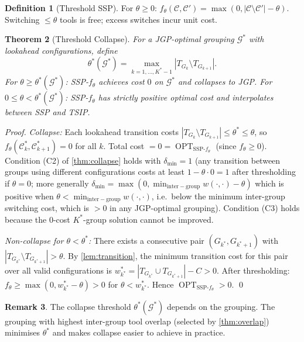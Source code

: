 \documentclass[11pt,a4paper]{article}
\theoremstyle{plain}
\newtheorem{theorem}{Theorem}[section]
\theoremstyle{definition}
\newtheorem{definition}[theorem]{Definition}
\newtheorem{remark}[theorem]{Remark}
\DeclareMathOperator{\OPT}{OPT}
\newcommand{\calG}{\mathcal{G}}
\newcommand{\Kstar}{K^{*}}
\newcommand{\sw}[2]{w(#1,#2)}
\begin{document}
\begin{definition}[Threshold SSP]
For $\theta\ge 0$:
$f_\theta(\mathcal{C},\mathcal{C}')=\max(0,|\mathcal{C}\setminus\mathcal{C}'|-\theta)$.
Switching $\le\theta$ tools is free; excess switches incur unit cost.
\end{definition}

\begin{thmbox}
\begin{theorem}[Threshold Collapse]
\label{thm:threshold}
For a JGP-optimal grouping $\calG^*$ with lookahead configurations, define
\[
  \theta^*(\calG^*)=\max_{k=1,\ldots,\Kstar-1}|T_{G_k}\setminus T_{G_{k+1}}|.
\]
For $\theta\ge\theta^*(\calG^*)$: SSP-$f_\theta$ achieves cost $0$ on $\calG^*$
and collapses to JGP. For $0\le\theta<\theta^*(\calG^*)$: SSP-$f_\theta$ has
strictly positive optimal cost and interpolates between SSP and TSIP.
\end{theorem}
\end{thmbox}

\begin{proof}
\textit{Collapse:}
Each lookahead transition costs $|T_{G_k}\setminus T_{G_{k+1}}|\le\theta^*\le\theta$,
so $f_\theta(\mathcal{C}_k^*,\mathcal{C}_{k+1}^*)=0$ for all $k$.
Total cost $=0=\OPT_{\mathrm{SSP}\text{-}f_\theta}$ (since $f_\theta\ge 0$).
Condition (C2) of \cref{thm:collapse} holds with $\delta_{\min}=1$ (any transition
between groups using different configurations costs at least $1-\theta\cdot 0=1$
after thresholding if $\theta=0$; more generally $\delta_{\min}=
\max(0,\min_{\mathrm{inter-group}}\sw{\cdot}{\cdot}-\theta)$ which is positive
when $\theta<\min_{\mathrm{inter-group}}\sw{\cdot}{\cdot}$, i.e.\ below the minimum
inter-group switching cost, which is $>0$ in any JGP-optimal grouping).
Condition (C3) holds because the $0$-cost $\Kstar$-group solution cannot be improved.

\textit{Non-collapse for $\theta<\theta^*$:}
There exists a consecutive pair $(G_{k^*},G_{k^*+1})$ with
$|T_{G_{k^*}}\setminus T_{G_{k^*+1}}|>\theta$.
By \cref{lem:transition}, the minimum transition cost for this pair over all valid
configurations is $w^*_{k^*}=|T_{G_{k^*}}\cup T_{G_{k^*+1}}|-C>0$.
After thresholding: $f_\theta\ge\max(0,w^*_{k^*}-\theta)>0$ for $\theta<w^*_{k^*}$.
Hence $\OPT_{\mathrm{SSP}\text{-}f_\theta}>0$. \qed
\end{proof}

\begin{remark}
The collapse threshold $\theta^*(\calG^*)$ depends on the grouping. The grouping with
highest inter-group tool overlap (selected by \cref{thm:overlap}) minimises $\theta^*$
and makes collapse easier to achieve in practice.
\end{remark}
\end{document}
